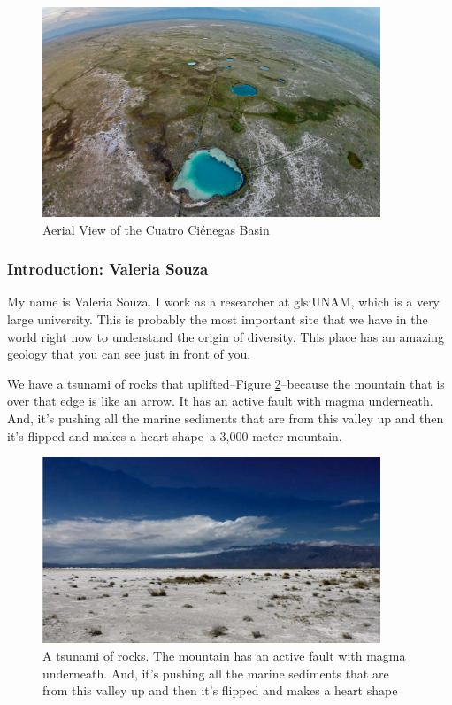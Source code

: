 \documentclass[]{article}
\begin{document}
\begin{figure}[H]
	\caption[Aerial View of the Cuatro Ci\'enegas Basin]{Aerial View of the Cuatro Ci\'enegas Basin\cite{perezortega2020pools}}\label{fig:ma_0703_NF_CuatroCienegas_aerial_1280}
	\includegraphics[width=0.9\textwidth]{ma_0703_NF_CuatroCienegas_aerial_1280}
\end{figure}

\subsubsection{Introduction: Valeria Souza}

My name is Valeria Souza. I work as a researcher at \gls{gls:UNAM}, which is a very large university. This is probably the most important site that we have in the world right now to understand the origin of diversity. This place has an amazing geology that you can see just in front of you.\cite{souza2018lost}

We have a tsunami of rocks that uplifted--Figure \ref{fig:CuatroCienegas2}--because the mountain that is over that edge is like an arrow. It has an active fault
with magma underneath. And, it's pushing all the marine sediments that are from this valley up and then it's flipped and makes a heart shape--a 3,000 meter mountain.

\begin{figure}[H]
	\caption[A tsunami of rocks]{A tsunami of rocks. The mountain has an active fault
		with magma underneath. And, it's pushing all the marine sediments that are from this valley up and then it's flipped and makes a heart shape}\label{fig:CuatroCienegas2}
	\includegraphics[width=0.9\textwidth]{CuatroCienegas2}
\end{figure}
\end{document}
